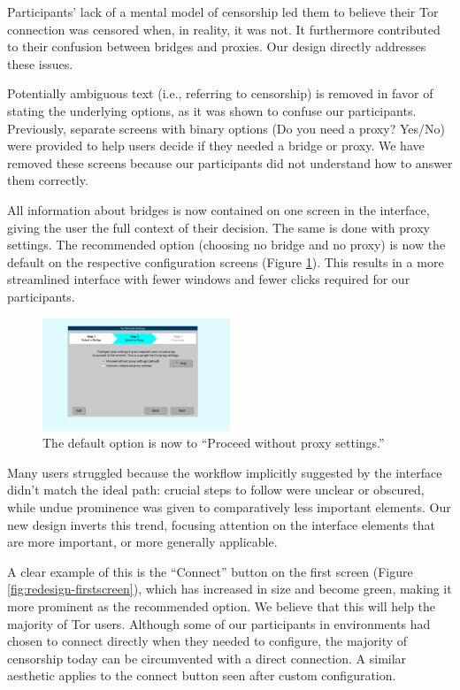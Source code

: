 \documentclass{template}
\begin{document}
Participants' lack of a mental model of censorship led them to believe their
Tor connection was censored when, in reality, it was not. It furthermore contributed
to their confusion between bridges and proxies. Our design directly addresses
these issues.

Potentially ambiguous text (i.e., referring to censorship) is removed in favor
of stating the underlying options, as it was shown to confuse our participants.
Previously, separate screens with binary options (Do you need a proxy? Yes/No) 
were provided to help users decide if they needed a bridge or proxy.
We have removed these screens
because our participants did not understand how to answer them correctly.

All information about bridges is now contained on one
screen in the interface, giving the user the full context of their decision.
The same is done with proxy settings.
The recommended option (choosing no bridge and no proxy) is now the default on
the respective configuration screens (Figure \ref{fig:redesign-noproxy}).
This results in a more streamlined interface with fewer windows
and fewer clicks required for our participants. \\

\begin{figure}[t]
\label{fig:redesign-noproxy}
  \centering
    \includegraphics[width=0.5\textwidth]{redesign-noproxy.png}
    \caption{The default option is now to ``Proceed without proxy settings.''}
\end{figure}

Many users struggled because the workflow implicitly suggested by the interface
didn't match the ideal path: crucial steps to follow were unclear or obscured,
while undue prominence was given to comparatively less important elements.
Our new design inverts this trend, focusing attention on the interface elements
that are more important, or more generally applicable.

A clear example of this is the ``Connect'' button on the first screen
(Figure \ref{fig:redesign-firstscreen}), which has
increased in size and become green, making it more prominent as the recommended
option. We believe that this will help the majority of Tor users. 
Although some of our participants in environments had chosen to connect
directly when they needed to configure,
the majority of censorship today can be circumvented with a direct connection. 
A similar aesthetic applies to the connect button seen after custom
configuration.
\end{document}
